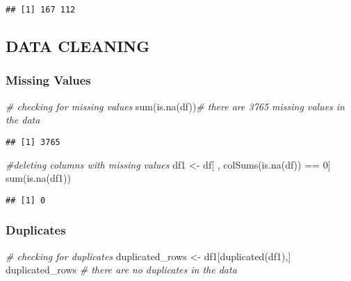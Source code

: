 \documentclass[
]{article}
\newenvironment{Shaded}{\begin{snugshade}}{\end{snugshade}}
\newcommand{\CommentTok}[1]{\textcolor[rgb]{0.56,0.35,0.01}{\textit{#1}}}
\newcommand{\DecValTok}[1]{\textcolor[rgb]{0.00,0.00,0.81}{#1}}
\newcommand{\FunctionTok}[1]{\textcolor[rgb]{0.00,0.00,0.00}{#1}}
\newcommand{\NormalTok}[1]{#1}
\newcommand{\OtherTok}[1]{\textcolor[rgb]{0.56,0.35,0.01}{#1}}
\newcommand{\SpecialCharTok}[1]{\textcolor[rgb]{0.00,0.00,0.00}{#1}}
\begin{document}
\begin{verbatim}
## [1] 167 112
\end{verbatim}

\hypertarget{data-cleaning}{%
\subsection{DATA CLEANING}\label{data-cleaning}}

\hypertarget{missing-values}{%
\subsubsection{Missing Values}\label{missing-values}}

\begin{Shaded}
\begin{Highlighting}[]
\CommentTok{\# checking for missing values}
\FunctionTok{sum}\NormalTok{(}\FunctionTok{is.na}\NormalTok{(df))}\CommentTok{\# there are 3765 missing values in the data}
\end{Highlighting}
\end{Shaded}

\begin{verbatim}
## [1] 3765
\end{verbatim}

\begin{Shaded}
\begin{Highlighting}[]
\CommentTok{\#deleting columns with missing values}
\NormalTok{df1 }\OtherTok{\textless{}{-}}\NormalTok{ df[ , }\FunctionTok{colSums}\NormalTok{(}\FunctionTok{is.na}\NormalTok{(df)) }\SpecialCharTok{==} \DecValTok{0}\NormalTok{]}
\FunctionTok{sum}\NormalTok{(}\FunctionTok{is.na}\NormalTok{(df1))}
\end{Highlighting}
\end{Shaded}

\begin{verbatim}
## [1] 0
\end{verbatim}

\hypertarget{duplicates}{%
\subsubsection{Duplicates}\label{duplicates}}

\begin{Shaded}
\begin{Highlighting}[]
\CommentTok{\# checking for duplicates}
\NormalTok{duplicated\_rows }\OtherTok{\textless{}{-}}\NormalTok{ df1[}\FunctionTok{duplicated}\NormalTok{(df1),]}
\NormalTok{duplicated\_rows }\CommentTok{\# there are no duplicates in the data}
\end{Highlighting}
\end{Shaded}
\end{document}
